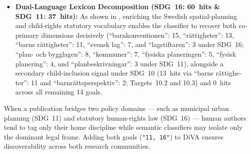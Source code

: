 \begin{casestudySection}
\begin{itemize}
    \item \textbf{Dual-Language Lexicon Decomposition (\gls{SDG}~16: \num{60}~hits \& \gls{SDG}~11: \num{37}~hits):} As shown in , enriching the Swedish spatial-planning and child-rights statutory vocabulary enables the classifier to recover both co-primary dimensions decisively (\enquote{\foreignlanguage{swedish}{barnkonventionen}}: 15, \enquote{\foreignlanguage{swedish}{rättigheter}}: 13, \enquote{\foreignlanguage{swedish}{barns rättigheter}}: 11, \enquote{\foreignlanguage{swedish}{svensk lag}}: 7, and \enquote{\foreignlanguage{swedish}{lagstiftaren}}: 3 under \gls{SDG}~16; \enquote{\foreignlanguage{swedish}{plan- och bygglagen}}: 8, \enquote{\foreignlanguage{swedish}{kommuner}}: 7, \enquote{\foreignlanguage{swedish}{fysiska planeringen}}: 5, \enquote{\foreignlanguage{swedish}{fysisk planering}}: 4, and \enquote{\foreignlanguage{swedish}{planbeskrivningar}}: 3 under \gls{SDG}~11), alongside a secondary child-inclusion signal under \gls{SDG}~10 (\num{13}~hits via \enquote{\foreignlanguage{swedish}{barns rättigheter}}: 11 and \enquote{\foreignlanguage{swedish}{barnrättsperspektiv}}: 2; Targets~10.2 and 10.3) and \num{0}~hits across all remaining \num{14} goals.
\end{itemize}
\end{casestudySection}

\begin{takeaway}
When a publication bridges two policy domains --- such as municipal urban planning (\gls{SDG}~11) and statutory human-rights law (\gls{SDG}~16) --- human authors tend to tag only their home discipline while semantic classifiers may isolate only the dominant legal frame. Adding both goals (\texttt{"11, 16"}) to \gls{DiVA} ensures discoverability across both research communities.
\end{takeaway}

